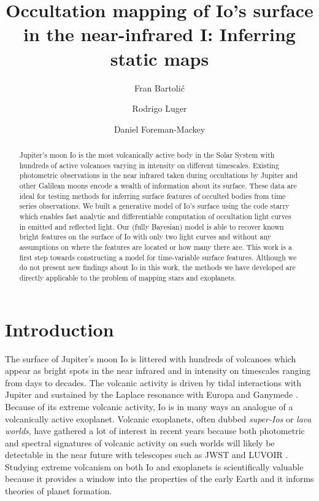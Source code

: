 \documentclass[modern]{aastex62}
\begin{document}
\title{Occultation mapping of Io's surface in the near-infrared I: Inferring static maps} 

\author{Fran Bartoli\'c}
\author{Rodrigo Luger}
\author{Daniel Foreman-Mackey}
%

\begin{abstract}
Jupiter's moon Io is the most volcanically active body in the Solar System with hundreds of active volcanoes varying in intensity on different timescales.
Existing photometric observations in the near infrared taken during occultations by Jupiter and other Galilean moons encode a wealth of information about its surface.
These data are ideal for testing methods for inferring surface features of occulted bodies from time series observations.
We built a generative model of Io's surface using the code starry \href{https://rodluger.github.io/starry/}{\color{linkcolor}\faGithub} which enables fast analytic and differentiable computation of occultation light curves in emitted and reflected light.
    Our (fully Bayesian) model is able to recover known bright features on the surface of Io with only two light curves and without any assumptions on where the features are located or how many there are.
    This work is a first step towards constructing a model for time-variable surface features. 
    Although we do not present new findings about Io in this work, the methods we have developed are directly applicable to the problem of mapping stars and exoplanets.\href{https://github.com/fbartolic/volcano}{\color{linkcolor}\faGithub}
\end{abstract}

%
\section{Introduction}
The surface of Jupiter's moon Io is littered with hundreds of volcanoes which appear as bright spots in the near infrared and in intensity on timescales ranging from days to decades.
The volcanic activity is driven by tidal interactions with Jupiter and sustained by the Laplace resonance with Europa and Ganymede \citep{peale1979}.
Because of its extreme volcanic activity, Io is in many ways an analogue of a volcanically active exoplanet.
Volcanic exoplanets, often dubbed \emph{super-Ios} or \emph{lava worlds}, have gathered a lot of interest in recent years because both photometric and spectral signatures of volcanic activity on such worlds will likely be detectable in the near future with telescopes such as JWST and LUVOIR \citep{kaltenegger2010,henning2018,oza2019}.
Studying extreme volcanism on both Io and exoplanets is scientifically valuable because it provides a window into the properties of the early Earth and it informs theories of planet formation.
\end{document}
